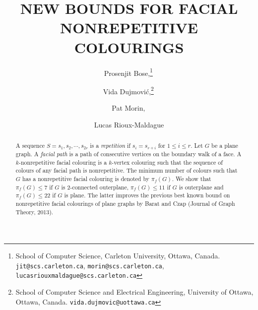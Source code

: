 \documentclass{patmorin}
\title{\MakeUppercase{New Bounds for Facial Nonrepetitive Colourings}}
\date{}
\author{Prosenjit Bose,\thanks{School of Computer Science, Carleton University, Ottawa, Canada. \texttt{jit@scs.carleton.ca}, \texttt{morin@scs.carleton.ca}, \texttt{lucasriouxmaldague@scs.carleton.ca}}\, %
\and Vida Dujmovi{\'c},\thanks{School of Computer Science and Electrical Engineering, University of Ottawa, Ottawa, Canada. \texttt{vida.dujmovic@uottawa.ca}}\,
\and Pat Morin,\samethanks[1]\, \and Lucas Rioux-Maldague\samethanks[1] }
\begin{document}


%
%
%



%
%

\maketitle

\begin{abstract}
A sequence $S=s_1,s_2,\cdots,s_{2r}$ is a \emph{repetition} if
$s_i=s_{r+i}$ for $1 \leq i \leq r$. Let $G$ be a plane graph. A
\emph{facial path} is a path of consecutive vertices on the boundary walk
of a face. A $k$-nonrepetitive facial colouring is a $k$-vertex colouring
such that the sequence of colours of any facial path is nonrepetitive. The
minimum number of colours such that $G$ has a nonrepetitive facial
colouring is denoted by $\pi_f(G)$. We show that $\pi_f(G)\leq 7$ if $G$
is 2-connected outerplane, $\pi_f(G) \leq 11$ if $G$ is outerplane and
$\pi_f(G)\leq 22$ if $G$ is plane. The latter improves the previous best
known bound on nonrepetitive facial colourings of plane graphs by Barat
and Czap (Journal of Graph Theory, 2013).
\end{abstract}
\end{document}
